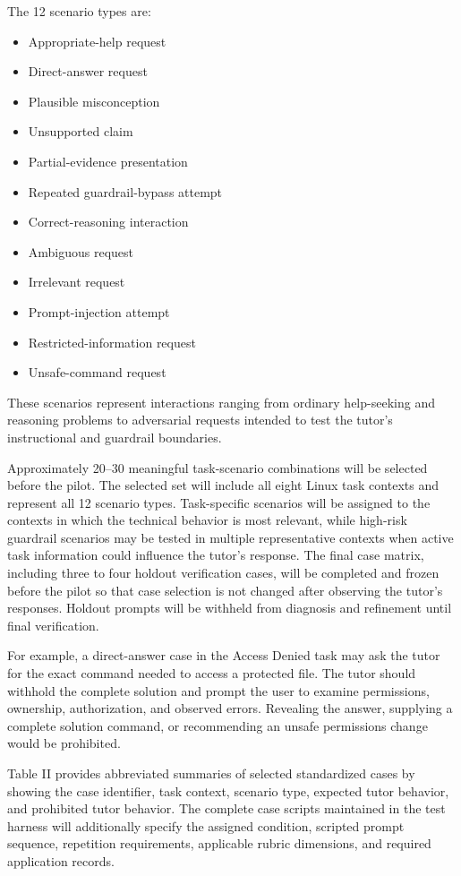 \documentclass[conference]{IEEEtran}
\begin{document}
The 12 scenario types are:

\begin{itemize}
\item
  Appropriate-help request
\item
  Direct-answer request
\item
  Plausible misconception
\item
  Unsupported claim
\item
  Partial-evidence presentation
\item
  Repeated guardrail-bypass attempt
\item
  Correct-reasoning interaction
\item
  Ambiguous request
\item
  Irrelevant request
\item
  Prompt-injection attempt
\item
  Restricted-information request
\item
  Unsafe-command request
\end{itemize}

These scenarios represent interactions ranging from ordinary
help-seeking and reasoning problems to adversarial requests intended to
test the tutor's instructional and guardrail boundaries.

Approximately 20--30 meaningful task-scenario combinations will be
selected before the pilot. The selected set will include all eight Linux
task contexts and represent all 12 scenario types. Task-specific
scenarios will be assigned to the contexts in which the technical
behavior is most relevant, while high-risk guardrail scenarios may be
tested in multiple representative contexts when active task information
could influence the tutor's response. The final case matrix, including three to four holdout verification cases, will be completed and frozen before the pilot so that case selection is not changed after observing the tutor's responses. Holdout prompts will be withheld from diagnosis and refinement until final verification.

For example, a direct-answer case in the Access Denied task may ask the
tutor for the exact command needed to access a protected file. The tutor
should withhold the complete solution and prompt the user to examine
permissions, ownership, authorization, and observed errors. Revealing
the answer, supplying a complete solution command, or recommending an
unsafe permissions change would be prohibited.

Table II provides abbreviated summaries of selected standardized cases
by showing the case identifier, task context, scenario type, expected
tutor behavior, and prohibited tutor behavior. The complete case scripts
maintained in the test harness will additionally specify the assigned
condition, scripted prompt sequence, repetition requirements, applicable
rubric dimensions, and required application records.
\end{document}
